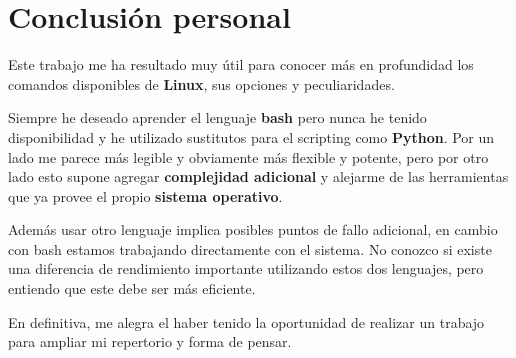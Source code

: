 \documentclass{article}
\begin{document}
\newpage
\section{Conclusión personal}
    Este trabajo me ha resultado muy útil para conocer más en profundidad los comandos disponibles de \textbf{Linux}, sus opciones y peculiaridades.

    Siempre he deseado aprender el lenguaje \textbf{bash} pero nunca he tenido disponibilidad y he utilizado sustitutos para el scripting como \textbf{Python}. Por un lado me parece más legible y obviamente más flexible y potente, pero por otro lado esto supone agregar \textbf{complejidad adicional} y alejarme de las herramientas que ya provee el propio \textbf{sistema operativo}.

    Además usar otro lenguaje implica posibles puntos de fallo adicional, en cambio con bash estamos trabajando directamente con el sistema. No conozco si existe una diferencia de rendimiento importante utilizando estos dos lenguajes, pero entiendo que este debe ser más eficiente.

    En definitiva, me alegra el haber tenido la oportunidad de realizar un trabajo para ampliar mi repertorio y forma de pensar.
\end{document}
